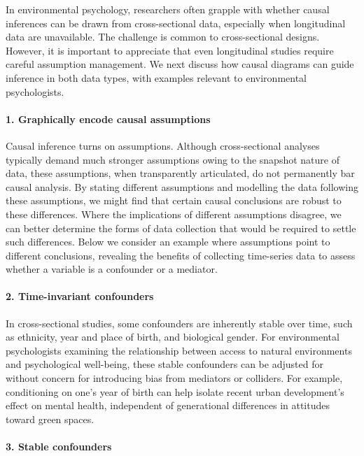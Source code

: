 \documentclass[
  singlecolumn]{article}
\let\oldparagraph\paragraph
\renewcommand{\paragraph}[1]{\oldparagraph{#1}\mbox{}}
\begin{document}
In environmental psychology, researchers often grapple with whether
causal inferences can be drawn from cross-sectional data, especially
when longitudinal data are unavailable. The challenge is common to
cross-sectional designs. However, it is important to appreciate that
even longitudinal studies require careful assumption management. We next
discuss how causal diagrams can guide inference in both data types, with
examples relevant to environmental psychologists.

\paragraph{1. Graphically encode causal
assumptions}\label{graphically-encode-causal-assumptions}

Causal inference turns on assumptions. Although cross-sectional analyses
typically demand much stronger assumptions owing to the snapshot nature
of data, these assumptions, when transparently articulated, do not
permanently bar causal analysis. By stating different assumptions and
modelling the data following these assumptions, we might find that
certain causal conclusions are robust to these differences. Where the
implications of different assumptions disagree, we can better determine
the forms of data collection that would be required to settle such
differences. Below we consider an example where assumptions point to
different conclusions, revealing the benefits of collecting time-series
data to assess whether a variable is a confounder or a mediator.

\paragraph{2. Time-invariant
confounders}\label{time-invariant-confounders}

In cross-sectional studies, some confounders are inherently stable over
time, such as ethnicity, year and place of birth, and biological gender.
For environmental psychologists examining the relationship between
access to natural environments and psychological well-being, these
stable confounders can be adjusted for without concern for introducing
bias from mediators or colliders. For example, conditioning on one's
year of birth can help isolate recent urban development's effect on
mental health, independent of generational differences in attitudes
toward green spaces.

\paragraph{3. Stable confounders}\label{stable-confounders}
\end{document}
